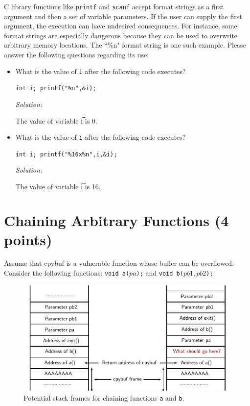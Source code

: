 \documentclass[a4paper,11pt]{article}
\newenvironment{solution}%
{\par{\noindent\small\textit{Solution:}}\vspace{-1ex}\begin{framed}}%
{\end{framed}\par}
\begin{document}
C library functions like \texttt{printf} and \texttt{scanf} accept format
strings as a first argument and then a set of variable parameters. If the user
can supply the first argument, the execution can have undesired consequences.
For instance, some format strings are especially dangerous because they can be
used to overwrite arbitrary memory locations. The ``\%n" format string is one
such example. Please answer the following questions regarding its use:

\begin{itemize}
  \item What is the value of \texttt{i} after the following code executes?

  \texttt{int i; printf("\%n",\&i);}

  \ifsolution
  \begin{solution}
	  The value of variable \t{i} is 0.
\end{solution}
  \fi

  \item What is the value of \texttt{i} after the following code executes?

  \texttt{int i; printf("\%16x\%n",i,\&i);}

  \ifsolution
  \begin{solution}
  The value of variable \t{i} is 16.
\end{solution}
  \fi
\end{itemize}


\section*{Chaining Arbitrary Functions (4 points)}

Assume that cpybuf is a vulnerable function whose buffer can be
overflowed. Consider the following functions: \texttt{void a(\(pa\));} and
\texttt{void b(\(pb1, pb2\));}

\begin{figure}[t]
    \centering
    \includegraphics[width=0.8\linewidth]{./stacks.pdf}
    \caption{Potential stack frames for chaining functions \texttt{a} and
    \texttt{b}.}
    \label{fig:stacks}
\end{figure}
\end{document}
